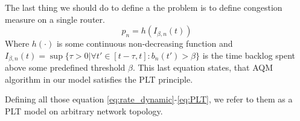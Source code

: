 The last thing we should do to define a the problem is to define congestion measure on a single router.
\begin{equation}
    p_n = h(I_{\beta,n}(t)) \label{eq:PLT}
\end{equation}
Where $h(\cdot)$ is some continuous non-decreasing function and $I_{\beta,n}(t) = \sup \{\tau > 0 | \forall t' \in [t - \tau, t] : b_n(t') > \beta\}$ is the time backlog spent above some predefined threshold $\beta$. This last equation states, that AQM algorithm in our model satisfies the PLT principle.

Defining all those equation \ref{eq:rate_dynamic}-\ref{eq:PLT}, we refer to them as a PLT model on arbitrary network topology.